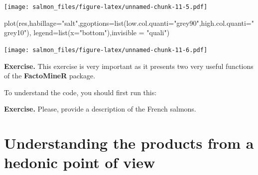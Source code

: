 \documentclass[
]{book}
\newenvironment{Shaded}{\begin{snugshade}}{\end{snugshade}}
\newcommand{\AttributeTok}[1]{\textcolor[rgb]{0.77,0.63,0.00}{#1}}
\newcommand{\DecValTok}[1]{\textcolor[rgb]{0.00,0.00,0.81}{#1}}
\newcommand{\FunctionTok}[1]{\textcolor[rgb]{0.00,0.00,0.00}{#1}}
\newcommand{\NormalTok}[1]{#1}
\newcommand{\SpecialCharTok}[1]{\textcolor[rgb]{0.00,0.00,0.00}{#1}}
\newcommand{\StringTok}[1]{\textcolor[rgb]{0.31,0.60,0.02}{#1}}
\begin{document}
\texttt{[image: salmon\_files/figure-latex/unnamed-chunk-11-5.pdf]}

\begin{Shaded}
\begin{Highlighting}[]
\FunctionTok{plot}\NormalTok{(res,}\AttributeTok{habillage=}\StringTok{"salt"}\NormalTok{,}\AttributeTok{ggoptions=}\FunctionTok{list}\NormalTok{(}\AttributeTok{low.col.quanti=}\StringTok{"grey90"}\NormalTok{,}\AttributeTok{high.col.quanti=}\StringTok{"grey10"}\NormalTok{),}
\AttributeTok{legend=}\FunctionTok{list}\NormalTok{(}\AttributeTok{x=}\StringTok{"bottom"}\NormalTok{),}\AttributeTok{invisible =} \StringTok{"quali"}\NormalTok{)}
\end{Highlighting}
\end{Shaded}

\texttt{[image: salmon\_files/figure-latex/unnamed-chunk-11-6.pdf]}

\textbf{Exercise. }This exercise is very important as it presents two very useful functions of the \textbf{FactoMineR} package.

\begin{Shaded}
\end{Shaded}

To understand the code, you should first run this:

\begin{Shaded}
\end{Shaded}

\textbf{Exercise. }Please, provide a description of the French salmons.

\hypertarget{understanding-the-products-from-a-hedonic-point-of-view}{%
\section{Understanding the products from a hedonic point of view}\label{understanding-the-products-from-a-hedonic-point-of-view}}
\end{document}
